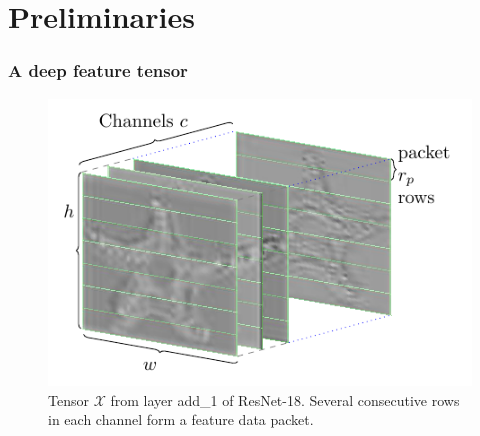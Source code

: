 \documentclass[aspectratio=169]{beamer}
\begin{document}
\section{Preliminaries}
\begin{frame}
	\frametitle{A deep feature tensor}
	\begin{figure}[H]
		\centering\includegraphics[scale=0.9]{tensorlostviz3icip.pdf}
		\caption{Tensor $\mathcal{X}$ from layer add\_1 of ResNet-18. Several consecutive rows in each channel form a feature data packet.}
	\end{figure}
\end{frame}
\end{document}
